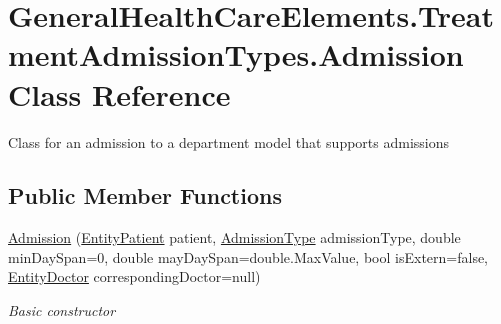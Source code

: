 \hypertarget{class_general_health_care_elements_1_1_treatment_admission_types_1_1_admission}{}\section{General\+Health\+Care\+Elements.\+Treatment\+Admission\+Types.\+Admission Class Reference}
\label{class_general_health_care_elements_1_1_treatment_admission_types_1_1_admission}


Class for an admission to a department model that supports admissions  


\subsection*{Public Member Functions}
\begin{DoxyCompactItemize}
\item 
\hyperlink{class_general_health_care_elements_1_1_treatment_admission_types_1_1_admission_ab16b9fcdea91046e3bf05761b2b2c1d6}{Admission} (\hyperlink{class_general_health_care_elements_1_1_entities_1_1_entity_patient}{Entity\+Patient} patient, \hyperlink{class_general_health_care_elements_1_1_treatment_admission_types_1_1_admission_type}{Admission\+Type} admission\+Type, double min\+Day\+Span=0, double may\+Day\+Span=double.\+Max\+Value, bool is\+Extern=false, \hyperlink{class_general_health_care_elements_1_1_entities_1_1_entity_doctor}{Entity\+Doctor} corresponding\+Doctor=null)
\begin{DoxyCompactList}\small\item\em Basic constructor \end{DoxyCompactList}\end{DoxyCompactItemize}
